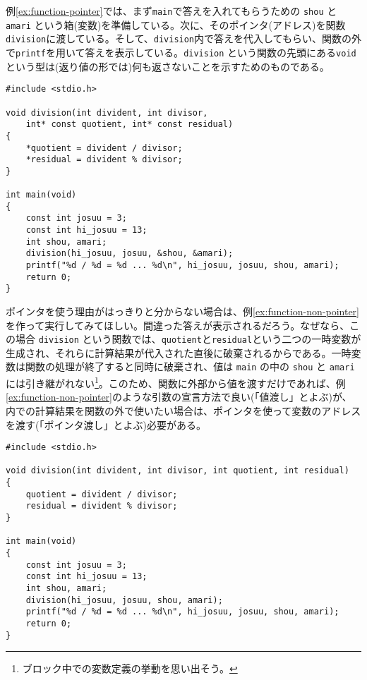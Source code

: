例\ref{ex:function-pointer}では、まず\texttt{main}で答えを入れてもらうための \texttt{shou} と \texttt{amari} という箱(変数)を準備している。次に、そのポインタ(アドレス)を関数\texttt{division}に渡している。そして、\texttt{division}内で答えを代入してもらい、関数の外で\texttt{printf}を用いて答えを表示している。\texttt{division} という関数の先頭にある\texttt{void}という型は(返り値の形では)何も返さないことを示すためのものである。
\begin{reidai}\label{ex:function-pointer}
    \begin{verbatim}
#include <stdio.h>

void division(int divident, int divisor,
    int* const quotient, int* const residual)
{
    *quotient = divident / divisor;
    *residual = divident % divisor;
}

int main(void)
{
    const int josuu = 3;
    const int hi_josuu = 13;
    int shou, amari;
    division(hi_josuu, josuu, &shou, &amari);
    printf("%d / %d = %d ... %d\n", hi_josuu, josuu, shou, amari);
    return 0;
}
\end{verbatim}
\end{reidai} \noindent
ポインタを使う理由がはっきりと分からない場合は、例\ref{ex:function-non-pointer}を作って実行してみてほしい。間違った答えが表示されるだろう。なぜなら、この場合 \texttt{division} という関数では、\texttt{quotient}と\texttt{residual}という二つの一時変数が生成され、それらに計算結果が代入された直後に破棄されるからである。一時変数は関数の処理が終了すると同時に破棄され、値は \texttt{main} の中の \texttt{shou} と \texttt{amari} には引き継がれない\footnote{ブロック中での変数定義の挙動を思い出そう。}。このため、関数に外部から値を渡すだけであれば、例\ref{ex:function-non-pointer}のような引数の宣言方法で良い(「値渡し」とよぶ)が、内での計算結果を関数の外で使いたい場合は、ポインタを使って変数のアドレスを渡す(「ポインタ渡し」とよぶ)必要がある。
\begin{reidai}\label{ex:function-non-pointer}
    \begin{verbatim}
#include <stdio.h>

void division(int divident, int divisor, int quotient, int residual)
{
    quotient = divident / divisor;
    residual = divident % divisor;
}

int main(void)
{
    const int josuu = 3;
    const int hi_josuu = 13;
    int shou, amari;
    division(hi_josuu, josuu, shou, amari);
    printf("%d / %d = %d ... %d\n", hi_josuu, josuu, shou, amari);
    return 0;
}
\end{verbatim}
\end{reidai}

